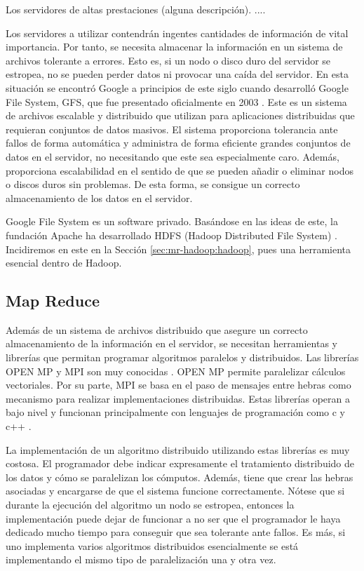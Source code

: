 \documentclass[10pt]{article}
\begin{document}
		Los servidores de altas prestaciones (alguna descripción). .... 
		
		Los servidores a utilizar contendrán ingentes cantidades de información de vital importancia. Por tanto, se necesita almacenar la información en un sistema de archivos tolerante a errores. Esto es, si un nodo o disco duro del servidor se estropea, no se pueden perder datos ni provocar una caída del servidor. En esta situación se encontró Google a principios de este siglo cuando desarrolló Google File System, GFS, que fue presentado oficialmente en 2003 \cite{gfs}. Este es un sistema de archivos escalable y distribuido que utilizan para aplicaciones distribuidas que requieran conjuntos de datos masivos. El sistema proporciona tolerancia ante fallos de forma automática y administra de forma eficiente grandes conjuntos de datos en el servidor, no necesitando que este sea especialmente caro. Además, proporciona escalabilidad en el sentido de que se pueden añadir o eliminar nodos o discos duros sin problemas. De esta forma, se consigue un correcto almacenamiento de los datos en el servidor.
		
		Google File System es un software privado. Basándose en las ideas de este, la fundación Apache ha desarrollado HDFS (Hadoop Distributed File System) \cite{hdfs}. Incidiremos en este en la Sección \ref{sec:mr-hadoop:hadoop}, pues una herramienta esencial dentro de Hadoop.				

	\subsection{Map Reduce} \label{sec:mr-hadoop:map-reduce}

		Además de un sistema de archivos distribuido que asegure un correcto almacenamiento de la información en el servidor, se necesitan herramientas y librerías que permitan programar algoritmos paralelos y distribuidos. Las librerías OPEN MP y MPI son muy conocidas \cite{openmpmpi}. OPEN MP permite paralelizar cálculos vectoriales. Por su parte, MPI se basa en el paso de mensajes entre hebras como mecanismo para realizar implementaciones distribuidas. Estas librerías operan a bajo nivel y funcionan principalmente con lenguajes de programación como c y c++ \cite{openmp}. 
		
		La implementación de un algoritmo distribuido utilizando estas librerías es muy costosa. El programador debe indicar expresamente el tratamiento distribuido de los datos y cómo se paralelizan los cómputos. Además, tiene que crear las hebras asociadas y encargarse de que el sistema funcione correctamente. Nótese que si durante la ejecución del algoritmo un nodo se estropea, entonces la implementación puede dejar de funcionar a no ser que el programador le haya dedicado mucho tiempo para conseguir que sea tolerante ante fallos. Es más, si uno implementa varios algoritmos distribuidos esencialmente se está implementando el mismo tipo de paralelización una y otra vez.
	
\end{document}
